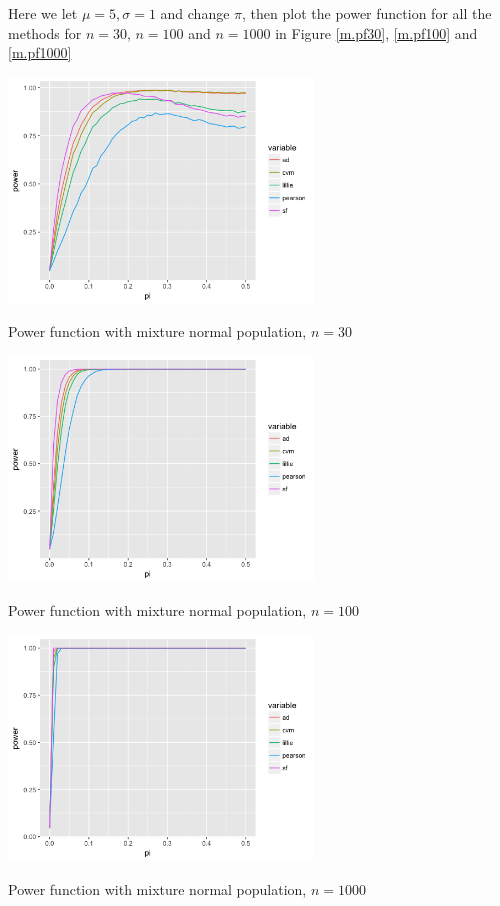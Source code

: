 \documentclass[twoside]{article}
\begin{document}
Here we let $\mu=5, \sigma=1$ and change $\pi$, then plot the power function for all the methods for $n=30$, $n=100$ and $n=1000$ in Figure \ref{m.pf30}, \ref{m.pf100} and \ref{m.pf1000}

\begin{center}
\makeatletter
\def\@captype{figure}
\makeatother
\includegraphics [height=6cm]{code/mixture.30.png}
\caption{Power function with mixture normal population, $n=30$}
\label{m.pf30}
\end{center}

\begin{center}
\makeatletter
\def\@captype{figure}
\makeatother
\includegraphics [height=6cm]{code/mixture.100.png}
\caption{Power function with mixture normal population, $n=100$}
\label{m.pf100}
\end{center}

\begin{center}
\makeatletter
\def\@captype{figure}
\makeatother
\includegraphics [height=6cm]{code/mixture.1000.png}
\caption{Power function with mixture normal population, $n=1000$}
\label{m.pf1000}
\end{center}
\end{document}
